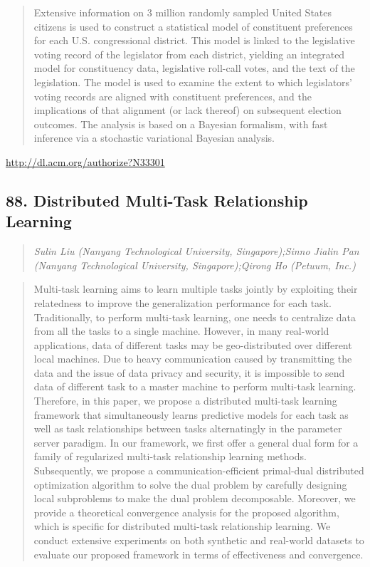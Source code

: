 \documentclass{article}
\begin{document}
\begin{quote}
Extensive information on 3 million randomly sampled United States citizens is used to construct a statistical model of constituent preferences for each U.S. congressional district. This model is linked to the legislative voting record of the legislator from each district, yielding an integrated model for constituency data, legislative roll-call votes, and the text of the legislation. The model is used to examine the extent to which legislators’ voting records are aligned with constituent preferences, and the implications of that alignment (or lack thereof) on subsequent election outcomes. The analysis is based on a Bayesian formalism, with fast inference via a stochastic variational Bayesian analysis.
\end{quote}

\href{http://dl.acm.org/authorize?N33301}{http://dl.acm.org/authorize?N33301}

\subsection{88. Distributed Multi-Task Relationship Learning}

\begin{quote}
\footnotesize{\textit{Sulin Liu (Nanyang Technological University, Singapore);Sinno Jialin Pan (Nanyang Technological University, Singapore);Qirong Ho (Petuum, Inc.)}}

\end{quote}

\begin{quote}
Multi-task learning aims to learn multiple tasks jointly by exploiting their relatedness to improve the generalization performance for each task. Traditionally, to perform multi-task learning, one needs to centralize data from all the tasks to a single machine. However, in many real-world applications, data of different tasks may be geo-distributed over different local machines. Due to heavy communication caused by transmitting the data and the issue of data privacy and security, it is impossible to send data of different task to a master machine to perform multi-task learning. Therefore, in this paper, we propose a distributed multi-task learning framework that simultaneously learns predictive models for each task as well as task relationships between tasks alternatingly in the parameter server paradigm. In our framework, we first offer a general dual form for a family of regularized multi-task relationship learning methods. Subsequently, we propose a communication-efficient primal-dual distributed optimization algorithm to solve the dual problem by carefully designing local subproblems to make the dual problem decomposable. Moreover, we provide a theoretical convergence analysis for the proposed algorithm, which is specific for distributed multi-task relationship learning. We conduct extensive experiments on both synthetic and real-world datasets to evaluate our proposed framework in terms of effectiveness and convergence.
\end{quote}
\end{document}
